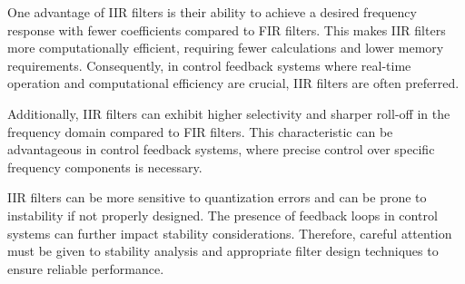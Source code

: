 \documentclass[11pt]{article}
\begin{document}
One advantage of IIR filters is their ability to achieve a desired frequency response with fewer coefficients compared to FIR filters. This makes IIR filters more computationally efficient, requiring fewer calculations and lower memory requirements. Consequently, in control feedback systems where real-time operation and computational efficiency are crucial, IIR filters are often preferred.

Additionally, IIR filters can exhibit higher selectivity and sharper roll-off in the frequency domain compared to FIR filters. This characteristic can be advantageous in control feedback systems, where precise control over specific frequency components is necessary.

{}
IIR filters can be more sensitive to quantization errors and can be prone to instability if not properly designed. The presence of feedback loops in control systems can further impact stability considerations. Therefore, careful attention must be given to stability analysis and appropriate filter design techniques to ensure reliable performance.
\end{document}
